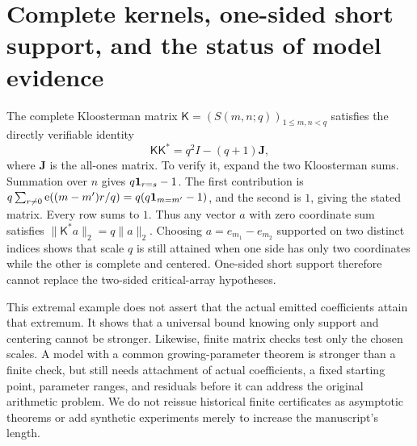 \section{Complete kernels, one-sided short support, and the status of model evidence}
The complete Kloosterman matrix $\mathsf K=(S(m,n;q))_{1\le m,n<q}$ satisfies the directly verifiable identity
\[
\mathsf K\mathsf K^*=q^2I-(q+1)\mathbf J,
\]
where $\mathbf J$ is the all-ones matrix. To verify it, expand the two Kloosterman sums. Summation over $n$ gives $q\mathbf 1_{r=s}-1$.
The first contribution is
$q\sum_{r\ne0}\mathrm e((m-m')r/q)=q(q\mathbf 1_{m=m'}-1)$, and the second is $1$, giving the stated matrix. Every row sums to $1$.
Thus any vector $a$ with zero coordinate sum satisfies $\|\mathsf K^*a\|_2=q\|a\|_2$.
Choosing $a=e_{m_1}-e_{m_2}$ supported on two distinct indices shows that scale $q$ is still attained when one side has only two coordinates while the other is complete and centered.
One-sided short support therefore cannot replace the two-sided critical-array hypotheses.

This extremal example does not assert that the actual emitted coefficients attain that extremum.
It shows that a universal bound knowing only support and centering cannot be stronger.
Likewise, finite matrix checks test only the chosen scales. A model with a common growing-parameter theorem is stronger than a finite check, but still needs attachment of actual coefficients, a fixed starting point, parameter ranges, and residuals before it can address the original arithmetic problem.
We do not reissue historical finite certificates as asymptotic theorems or add synthetic experiments merely to increase the manuscript's length.
